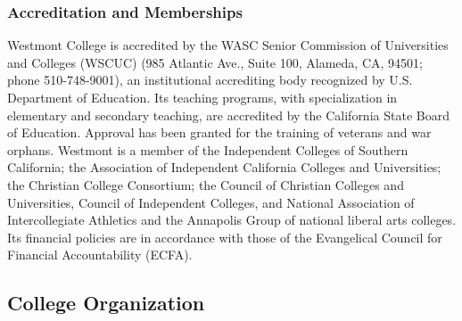 \documentclass[letterpaper, 11pt]{article}
\begin{document}
\subsubsection{Accreditation and Memberships}
   Westmont College is accredited by the WASC Senior Commission of Universities and Colleges (WSCUC) (985 Atlantic Ave., Suite 100, Alameda, CA, 94501; phone 510-748-9001), an institutional accrediting body recognized by U.S. Department of Education.  Its teaching programs, with specialization in elementary and secondary teaching, are accredited by the California State Board of Education. Approval has been granted for the training of veterans and war orphans.
   Westmont is a member of the Independent Colleges of Southern California; the Association of Independent California Colleges and Universities; the Christian College Consortium; the Council of Christian Colleges and Universities, Council of Independent Colleges, and National Association of Intercollegiate Athletics and the Annapolis Group of national liberal arts colleges.  Its financial policies are in accordance with those of the Evangelical Council for Financial Accountability (ECFA).
\subsection{College Organization}
\end{document}
